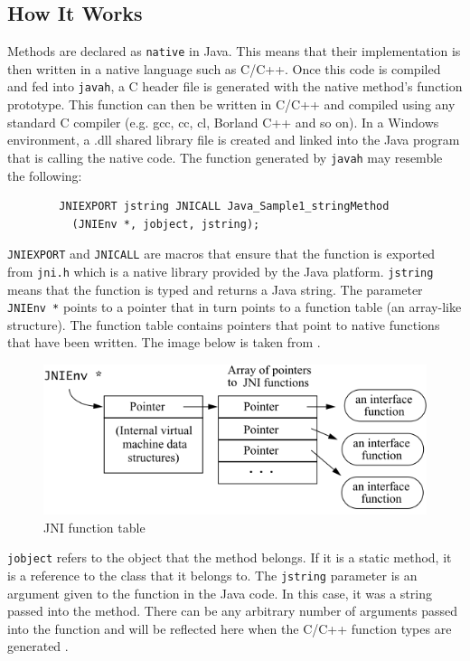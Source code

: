 \documentclass[12pt] {newrucsthesis}    %
\def\code#1{\texttt{#1}}
\begin{document}
      \subsection{How It Works}
        Methods are declared as \code{native} in Java. This means that their implementation is then written in a native
        language such as C/C++. Once this code is compiled and fed into \code{javah}, a C header file is generated
        with the native method's function prototype. This function can then be written in C/C++ and compiled using
        any standard C compiler (e.g. gcc, cc, cl, Borland C++ and so on). In a Windows environment, a .dll shared
        library file is created and linked into the Java program that is calling the native code. The function
        generated by \code{javah} may resemble the following:
        \begin{verbatim}
        JNIEXPORT jstring JNICALL Java_Sample1_stringMethod
          (JNIEnv *, jobject, jstring);
        \end{verbatim}
        \code{JNIEXPORT} and \code{JNICALL} are macros that ensure that the function is exported from \code{jni.h}
        which is a native library provided by the Java platform. \code{jstring} means that the function is
        typed and returns a Java string. The parameter \code{JNIEnv *} points to a pointer that in turn points
        to a function table (an array-like structure). The function table contains pointers that point to native
        functions that have been written. The image below is taken from \cite{LiangJNISpecification}.
        \begin{figure}[H]
        \includegraphics[width=12cm]{jni_function_table}
        \caption{JNI function table}
        \end{figure}
        \code{jobject} refers to the object that the method belongs. If it is a static method, it is a
        reference to the class that it belongs to. The \code{jstring} parameter is an argument given to
        the function in the Java code. In this case, it was a string passed into the method. There can be
        any arbitrary number of arguments passed into the function and will be reflected here when the C/C++
        function types are generated \citep{LiangJNISpecification}.
\end{document}
